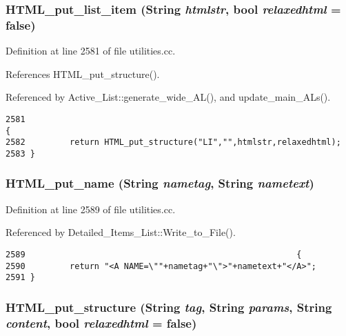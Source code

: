 \subsubsection{ HTML\_\-put\_\-list\_\-item ({\bf String} {\em htmlstr}, bool {\em relaxedhtml} = {\bf false})}\label{dil2al_8hh_a266}




Definition at line 2581 of file utilities.cc.

References HTML\_\-put\_\-structure().

Referenced by Active\_\-List::generate\_\-wide\_\-AL(), and update\_\-main\_\-ALs().



\footnotesize\begin{verbatim}2581                                                                     {
2582         return HTML_put_structure("LI","",htmlstr,relaxedhtml);
2583 }
\end{verbatim}\normalsize 
{}
\subsubsection{ HTML\_\-put\_\-name ({\bf String} {\em nametag}, {\bf String} {\em nametext})}\label{dil2al_8hh_a268}




Definition at line 2589 of file utilities.cc.

Referenced by Detailed\_\-Items\_\-List::Write\_\-to\_\-File().



\footnotesize\begin{verbatim}2589                                                       {
2590         return "<A NAME=\""+nametag+"\">"+nametext+"</A>";
2591 }
\end{verbatim}\normalsize 
{}
\subsubsection{ HTML\_\-put\_\-structure ({\bf String} {\em tag}, {\bf String} {\em params}, {\bf String} {\em content}, bool {\em relaxedhtml} = {\bf false})}\label{dil2al_8hh_a262}




